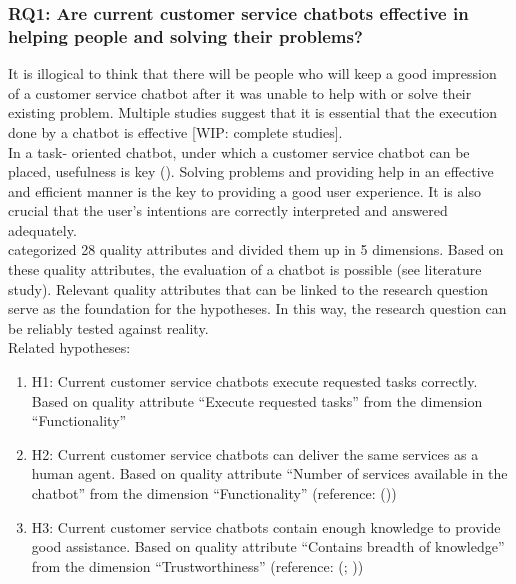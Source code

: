 \subsubsection{RQ1: Are current customer service chatbots effective in helping people and solving their problems?}
It is illogical to think that there will be people who will keep a good impression of a customer service chatbot after it was unable to help with or solve their existing problem. Multiple studies suggest that it is essential that the execution done by a chatbot is effective [WIP: complete studies].\\
In a task- oriented chatbot, under which a customer service chatbot can be placed, usefulness is key (\cite{brandtzaeg2020}). Solving problems and providing help in an effective and efficient manner is the key to providing a good user experience. It is also crucial that the user's intentions are correctly interpreted and answered adequately.\\
\break
\cite{Verkeyn2018} categorized 28 quality attributes and divided them up in 5 dimensions. Based on these quality attributes, the evaluation of a chatbot is possible (see literature study). Relevant quality attributes that can be linked to the research question serve as the foundation for the hypotheses. In this way, the research question can be reliably tested against reality.\\
\break
\break
Related hypotheses:
\begin{enumerate}
	\item H1: Current customer service chatbots execute requested tasks correctly. Based on \cite{Verkeyn2018} quality attribute “Execute requested tasks” from the dimension “Functionality”
	\item H2: Current customer service chatbots can deliver the same services as a human agent. Based on \cite{Verkeyn2018} quality attribute “Number of services available in the chatbot” from the dimension “Functionality” (reference: (\cite{Eeuwen2017}))
	\item H3: Current customer service chatbots contain enough knowledge to provide good assistance. Based on \cite{Verkeyn2018} quality attribute “Contains breadth of knowledge” from the dimension “Trustworthiness” (reference: (\cite{Cohen2016}; \cite{Kuligowska2015}))
\end{enumerate}

